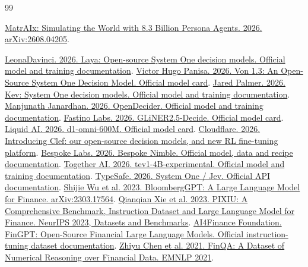 \documentclass[10pt]{article}
\begin{document}
\FloatBarrier
\begingroup
\fontsize{9}{11}\selectfont
\hypersetup{urlcolor=ink,linkcolor=ink}
\begin{thebibliography}{99}
\setlength{\itemsep}{1.25pt}
\setlength{\parsep}{0pt}
\raggedright
{} \href{https://arxiv.org/abs/2608.04205}{MatrAIx: Simulating the World with 8.3 Billion Persona Agents. 2026. arXiv:2608.04205}.

 \href{https://github.com/LeonaDavinci/laya-system-one}{LeonaDavinci. 2026. Laya: Open-source System One decision models. Official model and training documentation}.
 \href{https://huggingface.co/wfzyx/von}{Victor Hugo Panisa. 2026. Von 1.3: An Open-Source System One Decision Model. Official model card}.
 \href{https://github.com/jaredpalmer/kev}{Jared Palmer. 2026. Kev: System One decision models. Official model and training documentation}.
 \href{https://github.com/manjunathshiva/opendecider}{Manjunath Janardhan. 2026. OpenDecider. Official model and training documentation}.
 \href{https://huggingface.co/fastino/GLiNER2.5-Decide}{Fastino Labs. 2026. GLiNER2.5-Decide. Official model card}.
 \href{https://huggingface.co/LiquidAI/d1-omni-600M}{Liquid AI. 2026. d1-omni-600M. Official model card}.
 \href{https://blog.cloudflare.com/clef-decision-models/}{Cloudflare. 2026. Introducing Clef: our open-source decision models, and new RL fine-tuning platform}.
 \href{https://github.com/bespokelabsai/nimble}{Bespoke Labs. 2026. Bespoke Nimble. Official model, data and recipe documentation}.
 \href{https://github.com/togethercomputer/tev1}{Together AI. 2026. tev1-4B-experimental. Official model and training documentation}.
 \href{https://docs.typesafe.ai/introduction}{TypeSafe. 2026. System One / Jev. Official API documentation}.
 \href{https://arxiv.org/abs/2303.17564}{Shijie Wu et al. 2023. BloombergGPT: A Large Language Model for Finance. arXiv:2303.17564}.
 \href{https://proceedings.nips.cc/paper\_files/paper/2023/file/6a386d703b50f1cf1f61ab02a15967bb-Paper-Datasets\_and\_Benchmarks.pdf}{Qianqian Xie et al. 2023. PIXIU: A Comprehensive Benchmark, Instruction Dataset and Large Language Model for Finance. NeurIPS 2023, Datasets and Benchmarks}.
 \href{https://github.com/AI4Finance-Foundation/FinGPT}{AI4Finance Foundation. FinGPT: Open-Source Financial Large Language Models. Official instruction-tuning dataset documentation}.
 \href{https://aclanthology.org/2021.emnlp-main.300/}{Zhiyu Chen et al. 2021. FinQA: A Dataset of Numerical Reasoning over Financial Data. EMNLP 2021}.

\end{thebibliography}
\end{document}
